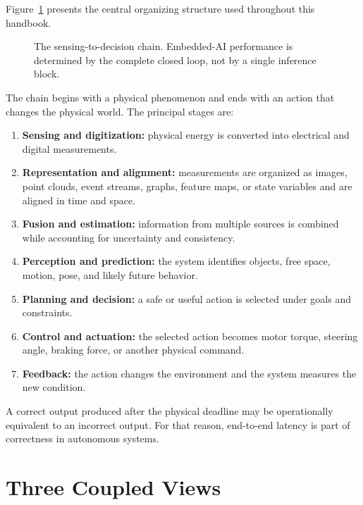 Figure~\ref{fig:sensing-to-decision} presents the central organizing structure used throughout this handbook.

\begin{figure}[H]
    \centering
    \resizebox{\textwidth}{!}{}
    \caption{The sensing-to-decision chain. Embedded-AI performance is determined by the complete closed loop, not by a single inference block.}
    \label{fig:sensing-to-decision}
\end{figure}

The chain begins with a physical phenomenon and ends with an action that changes the physical world. The principal stages are:

\begin{enumerate}[label=\arabic*.]
    \item \textbf{Sensing and digitization:} physical energy is converted into electrical and digital measurements.
    \item \textbf{Representation and alignment:} measurements are organized as images, point clouds, event streams, graphs, feature maps, or state variables and are aligned in time and space.
    \item \textbf{Fusion and estimation:} information from multiple sources is combined while accounting for uncertainty and consistency.
    \item \textbf{Perception and prediction:} the system identifies objects, free space, motion, pose, and likely future behavior.
    \item \textbf{Planning and decision:} a safe or useful action is selected under goals and constraints.
    \item \textbf{Control and actuation:} the selected action becomes motor torque, steering angle, braking force, or another physical command.
    \item \textbf{Feedback:} the action changes the environment and the system measures the new condition.
\end{enumerate}

\begin{keyinsight}
A correct output produced after the physical deadline may be operationally equivalent to an incorrect output. For that reason, end-to-end latency is part of correctness in autonomous systems.
\end{keyinsight}

\section{Three Coupled Views}

